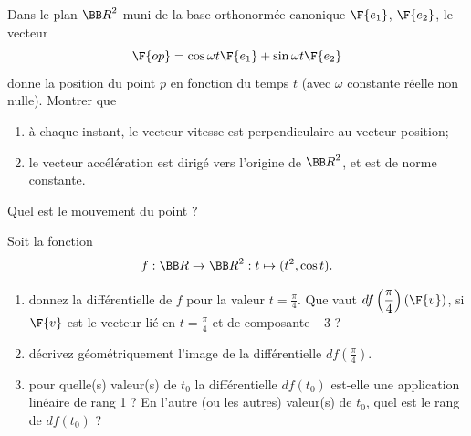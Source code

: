 \documentclass[12pt,french,oneside,a4paper]{memoir} %
\begin{document}
\begin{exo}
Dans le plan ${\BB R}^2$ muni de la base orthonormée canonique $\F{e_1}$,
$\F{e_2}$, le vecteur
\begin{equation*}
\F{op} = \cos \omega t \F{e_1} + \sin \omega t \F{e_2}
\end{equation*}
donne la position du point $p$ en fonction du temps $t$ (avec $\omega$
constante réelle non nulle). Montrer que
\begin{enumerate}
\item à chaque instant, le vecteur vitesse est perpendiculaire au vecteur position; 
\item le vecteur accélération est dirigé vers l'origine de ${\BB R}^2$, et
est de norme constante.
\end{enumerate}
Quel est le mouvement du point ?
\end{exo}
\begin{exo}
Soit la fonction
\begin{equation*}
f : {\BB R} \rightarrow {\BB R}^2 : t \mapsto (t^2, \cos t).
\end{equation*}
\begin{enumerate}
\item donnez la différentielle de $f$ pour la valeur
$t=\displaystyle{\frac{\pi}{4}}$. Que vaut $\displaystyle{df
\left( \frac{\pi}{4} \right) (\F{v})}$, si $\F{v}$ est le vecteur lié en $\displaystyle{t =
\frac{\pi}{4}}$ et de composante $+3$ ?
\item décrivez géométriquement l'image de la différentielle
$\displaystyle{df\left(\frac{\pi}{4}\right)}$. 
\item pour quelle(s) valeur(s) de $t_0$ la différentielle $df(t_0)$
est-elle une application linéaire de rang 1 ? En l'autre (ou les autres)
valeur(s) de $t_0$, quel est le rang de $df(t_0)$ ? 
\end{enumerate}
\end{exo}
\end{document}
